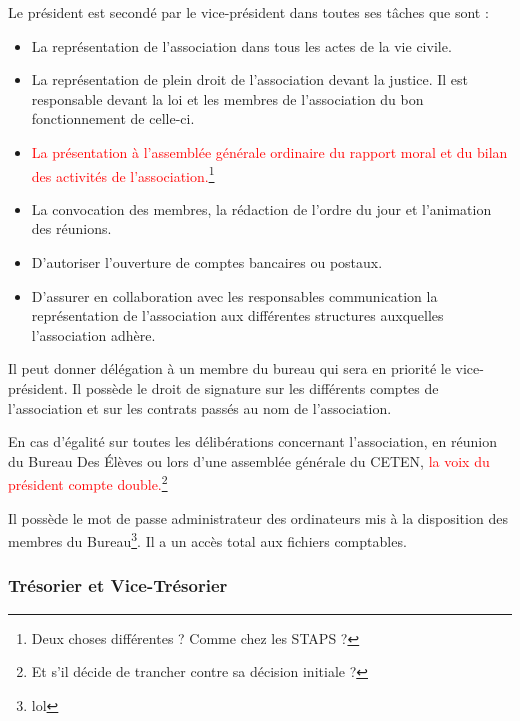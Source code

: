 \documentclass{article} %
\begin{document}
				Le président est secondé par le vice-président dans toutes ses
				tâches que sont :
				\begin{itemize}
					\item La représentation de l’association dans tous les actes
						de la vie civile.
					\item La représentation de plein droit de l’association
						devant la justice. Il est responsable devant la loi et
						les membres de l’association du bon fonctionnement de
						celle-ci.
					\item \textcolor{red}{La présentation à l’assemblée générale
						ordinaire du rapport moral et du bilan des activités de
						l’association.}\footnote{Deux choses différentes ? Comme
						chez les STAPS ?}
					\item La convocation des membres, la rédaction de l’ordre du
						jour et l’animation des réunions.
					\item D’autoriser l’ouverture de comptes bancaires ou
						postaux.
					\item D’assurer en collaboration avec les responsables
						communication la représentation de l’association aux
						différentes structures auxquelles l’association adhère. 
				\end{itemize}

				Il peut donner délégation à un membre du bureau qui sera en
				priorité le vice-président. Il possède le droit de signature sur
				les différents comptes de l'association et sur les contrats
				passés au nom de l’association.
				
				En cas d’égalité sur toutes les délibérations concernant
				l’association, en réunion du Bureau Des Élèves ou lors d’une
				assemblée générale du CETEN, \textcolor{red}{la voix du
				président compte double.}\footnote{Et s'il décide de trancher
				contre sa décision initiale ?}

				Il possède le mot de passe administrateur des ordinateurs mis à
				la disposition des membres du Bureau\footnote{lol}. Il a un
				accès total aux fichiers comptables.

			\subsubsection{Trésorier et Vice-Trésorier}
\end{document}
